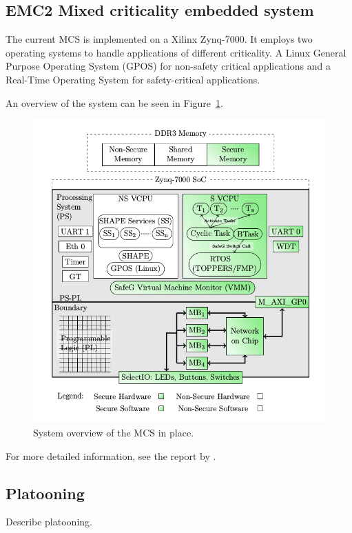 \subsection{EMC2 Mixed criticality embedded system}
\label{sec:mces}
The current MCS is implemented on a Xilinx Zynq-7000. It employs two operating systems to handle applications of different criticality. A Linux General Purpose Operating System (GPOS) for non-safety critical applications and a Real-Time Operating System for safety-critical applications. 


An overview of the system can be seen in Figure~\ref{fig:introduction_overview}.

\begin{figure}[H]
\centering
\includegraphics[width=\textwidth]{./img/introduction_overview.png}
\caption{System overview of the MCS in place.\cite{zaki2016}}\label{fig:introduction_overview}
\end{figure}

For more detailed information, see the report by \cite{zaki2016}.

\subsection{Platooning}
\label{sec:platooning}
Describe platooning.

